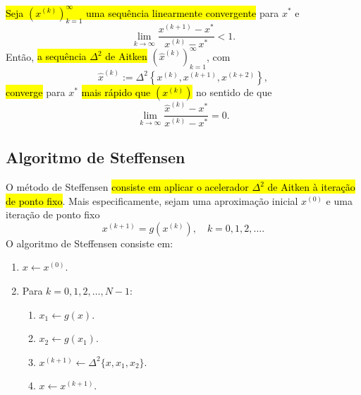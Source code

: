 \begin{teo}
  \hl{Seja $\left(x^{(k)}\right)_{k=1}^\infty$ uma sequência linearmente convergente} para $x^*$ e
  \begin{equation}\label{cap_eq1d_sec_Steffensen:eq:teo_aux}
    \lim_{k\to\infty}\frac{x^{(k+1)}-x^*}{x^{(k)}-x^*} < 1.
  \end{equation}
  Então, \hl{a sequência $\Delta^2$ de Aitken} $\left(\hat{x}^{(k)}\right)_{k=1}^\infty$, com
  \begin{equation}
    \hat{x}^{(k)} := \Delta^2\left\{x^{(k)}, x^{(k+1)}, x^{(k+2)}\right\},
  \end{equation}
  \hl{converge} para $x^*$ \hl{mais rápido que $\left(x^{(k)}\right)$} no sentido de que
  \begin{equation}
    \lim_{k\to\infty}\frac{\hat{x}^{(k)}-x^*}{x^{(k)}-x^*} = 0.
  \end{equation}
\end{teo}
\begin{dem}
  \emconstrucao
\end{dem}

\subsection{Algoritmo de Steffensen}

O método de Steffensen \hl{consiste em aplicar o acelerador $\Delta^2$ de Aitken à iteração de ponto fixo}. Mais especificamente, sejam uma aproximação inicial $x^{(0)}$ e uma iteração de ponto fixo
\begin{equation}
  x^{(k+1)} = g(x^{(k)}),\quad k=0, 1, 2, \ldots.
\end{equation}
O algoritmo de Steffensen consiste em:
\begin{enumerate}
\item $x \leftarrow x^{(0)}$.
\item Para $k=0, 1, 2, \dotsc, N-1$:
  \begin{enumerate}
  \item $x_1 \leftarrow g(x)$.
  \item $x_2 \leftarrow g(x_1)$.
  \item $x^{(k+1)} \leftarrow \Delta^2\{x,x_1,x_2\}$.
  \item $x \leftarrow x^{(k+1)}$.
  \end{enumerate}
\end{enumerate}


